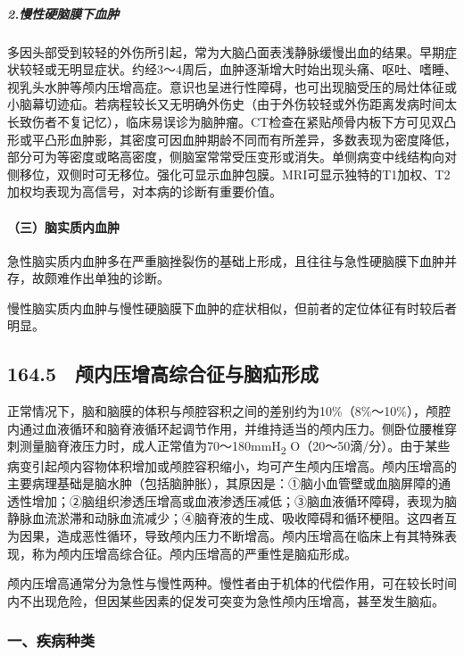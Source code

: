 \subparagraph{2.慢性硬脑膜下血肿}

多因头部受到较轻的外伤所引起，常为大脑凸面表浅静脉缓慢出血的结果。早期症状较轻或无明显症状。约经3～4周后，血肿逐渐增大时始出现头痛、呕吐、嗜睡、视乳头水肿等颅内压增高症。意识也呈进行性障碍，也可出现脑受压的局灶体征或小脑幕切迹疝。若病程较长又无明确外伤史（由于外伤较轻或外伤距离发病时间太长致伤者不复记忆），临床易误诊为脑肿瘤。CT检查在紧贴颅骨内板下方可见双凸形或平凸形血肿影，其密度可因血肿期龄不同而有所差异，多数表现为密度降低，部分可为等密度或略高密度，侧脑室常常受压变形或消失。单侧病变中线结构向对侧移位，双侧时可无移位。强化可显示血肿包膜。MRI可显示独特的T1加权、T2加权均表现为高信号，对本病的诊断有重要价值。

\paragraph{（三）脑实质内血肿}

急性脑实质内血肿多在严重脑挫裂伤的基础上形成，且往往与急性硬脑膜下血肿并存，故颇难作出单独的诊断。

慢性脑实质内血肿与慢性硬脑膜下血肿的症状相似，但前者的定位体征有时较后者明显。

\protect\hypertarget{text00379.html}{}{}

\subsection{164.5　颅内压增高综合征与脑疝形成}

正常情况下，脑和脑膜的体积与颅腔容积之间的差别约为10\%（8\%～10\%），颅腔内通过血液循环和脑脊液循环起调节作用，并维持适当的颅内压力。侧卧位腰椎穿刺测量脑脊液压力时，成人正常值为70～180mmH\textsubscript{2}
O（20～50滴/分）。由于某些病变引起颅内容物体积增加或颅腔容积缩小，均可产生颅内压增高。颅内压增高的主要病理基础是脑水肿（包括脑肿胀），其原因是：①脑小血管壁或血脑屏障的通透性增加；②脑组织渗透压增高或血液渗透压减低；③脑血液循环障碍，表现为脑静脉血流淤滞和动脉血流减少；④脑脊液的生成、吸收障碍和循环梗阻。这四者互为因果，造成恶性循环，导致颅内压力不断增高。颅内压增高在临床上有其特殊表现，称为颅内压增高综合征。颅内压增高的严重性是脑疝形成。

颅内压增高通常分为急性与慢性两种。慢性者由于机体的代偿作用，可在较长时间内不出现危险，但因某些因素的促发可突变为急性颅内压增高，甚至发生脑疝。

\subsubsection{一、疾病种类}

